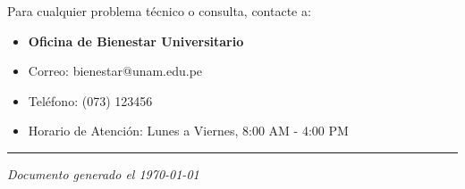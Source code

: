 \documentclass[12pt,a4paper]{article}
\begin{document}
Para cualquier problema técnico o consulta, contacte a:

\begin{itemize}
    \item \textbf{Oficina de Bienestar Universitario}
    \item Correo: bienestar@unam.edu.pe
    \item Teléfono: (073) 123456
    \item Horario de Atención: Lunes a Viernes, 8:00 AM - 4:00 PM
\end{itemize}

\vspace{2cm}
\hrule
\vspace{0.5cm}
\centering
\textit{Documento generado el \today}
\end{document}
